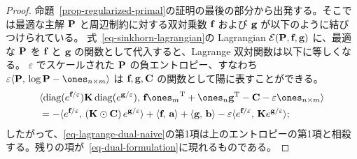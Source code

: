 \begin{proof}
命題~\ref{prop-regularized-primal}の証明の最後の部分から出発する。そこでは最適な主解 $\P$ と周辺制約に対する双対乗数 $\fD$ および $\gD$ が以下のように結びつけられている。
式~\eqref{eq-sinkhorn-lagrangian}の Lagrangian $\Lag(\P,\fD,\gD)$ に、最適な $\P$ を $\fD$ と $\gD$ の関数として代入すると、Lagrange 双対関数は以下に等しくなる。
$\varepsilon$ でスケールされた $\P$ の負エントロピー、すなわち $\varepsilon \dotp{\P}{\log \P - \ones_{n\times m}}$ は $\fD,\gD, \C$ の関数として陽に表すことができる。
\begin{align*}
&\dotp{\diag(e^{\fD/\varepsilon}) \K \diag(e^{\gD/\varepsilon})}{\fD\transp{\ones_m}+\ones_n\transp{\gD}-\C-\varepsilon\ones_{n\times m}}\\
&= -\dotp{e^{\fD/\varepsilon}}{\left(\K\odot \C\right)e^{\gD/\varepsilon}} + \dotp{\fD}{\a}+ \dotp{\gD}{\b}-\varepsilon \dotp{e^{\fD/\varepsilon}}{\K e^{\gD/\varepsilon}};
\end{align*}
したがって、\eqref{eq-lagrange-dual-naive}の第1項は上のエントロピーの第1項と相殺する。残りの項が~\eqref{eq-dual-formulation}に現れるものである。
\end{proof}



